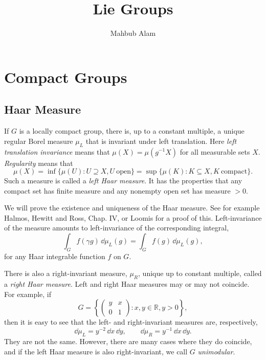 \documentclass[12pt,reqno]{book}%
\theoremstyle{definition}
\theoremstyle{remark}
\theoremstyle{theorem}
\theoremstyle{remark}
\renewcommand{\d}{\dd}
\begin{document}
\pagestyle{plain}

\title{\bf \Huge{Lie Groups}}

\author{Mahbub Alam}

\date{}

\maketitle

\thispagestyle{empty}

\part{Compact Groups}\label{}%
\chapter{Haar Measure}\label{}%
\vspace{5em}

If $G$ is a locally compact group, there is, up to a constant multiple, a unique regular Borel measure $\mu_L$ that is invariant under left translation.
Here \emph{left translation invariance} means that $\mu(X) = \mu(g^{-1}X)$ for all measurable sets $X$.
\emph{Regularity} means that
\[
    \mu(X) = \inf \{\mu(U) : U \supseteq X, U \ \text{open}\} = \sup \{\mu(K) : K \subseteq X, K \ \text{compact}\}.
\]
Such a measure is called a \emph{left Haar measure}.
It has the properties that any compact set has finite measure and any nonempty open set has measure $> 0$.
\newline

We will prove the existence and uniqueness of the Haar measure.
See for example Halmos, Hewitt and Ross, Chap. IV, or Loomis for a proof of this.
Left-invariance of the measure amounts to left-invariance of the corresponding integral,
\begin{equation}\label{eqlefthaarint}
    \int_{G} f(\gamma g) \, \d \mu_L(g) = \int_{G} f(g) \, \d \mu_L(g),
\end{equation}
for any Haar integrable function $f$ on $G$.

There is also a right-invariant measure, $\mu_R$, unique up to constant multiple, called a \emph{right Haar measure}.
Left and right Haar measures may or may not coincide.
For example, if
\[
    G = {\left\{ \begin{pmatrix}
                y & x  \\
                0 & 1
            \end{pmatrix}
            : x, y \in \mathbb{R}, y > 0\right\}},
\]
then it is easy to see that the left- and right-invariant measures are, respectively,
\[
    \d\mu_L = y^{-2} \, \d x \, \d y, \qquad \d\mu_R = y^{-1} \, \d x \, \d y.
\]
They are not the same.
However, there are many cases where they do coincide, and if the left Haar measure is also right-invariant, we call $G$ \emph{unimodular}.
\end{document}
